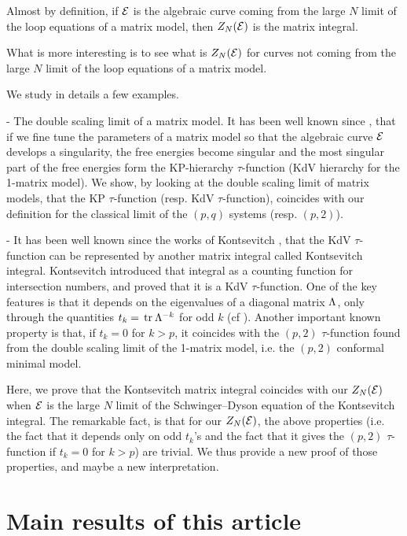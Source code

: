 \medskip




Almost by definition, if ${\cal E}$ is the algebraic curve coming from the large $N$ limit of the loop equations of a matrix model, then $Z_N({\cal E})$ is the matrix integral.

What is more interesting is to see what is $Z_N({\cal E})$ for curves not coming from the large $N$ limit of the loop equations of a matrix model.

We study in details a few examples.

\smallskip

- The double scaling limit of a matrix model. It has been well known since \cite{KazakovRMTcrit, ZJDFG}, that if we fine tune the parameters of a matrix model so that the algebraic curve ${\cal E}$ develops a singularity,
the free energies become singular and the most singular part of the free energies form the KP-hierarchy $\tau$-function (KdV hierarchy for the 1-matrix model).
We show, by looking at the double scaling limit of matrix models, that the KP $\tau$-function (resp. KdV $\tau$-function), coincides with our definition for the classical limit of the $(p,q)$ systems (resp. $(p,2)$).

- It has been well known since the works of Kontsevitch \cite{kontsevitch}, that the KdV $\tau$-function can be represented by another matrix integral called Kontsevitch integral.
Kontsevitch introduced that integral as a counting function for intersection numbers, and proved that it is a KdV $\tau$-function.
One of the key features is that it depends on the eigenvalues of a diagonal matrix $\Lambda$, only through the quantities $t_k={\,\rm tr}\: \Lambda^{-k}$ for odd $k$ (cf \cite{IZK,ZJDFG}).
Another important known property is that, if $t_k=0$ for $k> p$, it coincides with the $(p,2)$ $\tau$-function found from the double scaling limit of the 1-matrix model, i.e. the $(p,2)$ conformal minimal model.

Here, we prove that the Kontsevitch matrix integral coincides with our $Z_N({\cal E})$ when ${\cal E}$ is the large $N$ limit of the Schwinger--Dyson equation of the Kontsevitch integral.
The remarkable fact, is that for our $Z_N({\cal E})$, the above properties (i.e. the fact that it depends only on odd $t_k$'s and the fact that it gives the $(p,2)$ $\tau$-function if $t_k=0$ for $k>p$) are trivial.
We thus provide a new proof of those properties, and maybe a new interpretation.

\section{Main results of this article}

